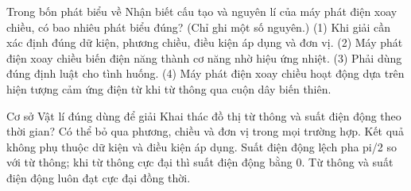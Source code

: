 \begin{ex}
Trong bốn phát biểu về Nhận biết cấu tạo và nguyên lí của máy phát điện xoay chiều, có bao nhiêu phát biểu đúng? (Chỉ ghi một số nguyên.) (1) Khi giải cần xác định đúng dữ kiện, phương chiều, điều kiện áp dụng và đơn vị. (2) Máy phát điện xoay chiều biến điện năng thành cơ năng nhờ hiệu ứng nhiệt. (3) Phải dùng đúng định luật cho tình huống. (4) Máy phát điện xoay chiều hoạt động dựa trên hiện tượng cảm ứng điện từ khi từ thông qua cuộn dây biến thiên.
\end{ex}

\begin{ex}
Cơ sở Vật lí đúng dùng để giải Khai thác đồ thị từ thông và suất điện động theo thời gian?
\choice
{Có thể bỏ qua phương, chiều và đơn vị trong mọi trường hợp.}
{Kết quả không phụ thuộc dữ kiện và điều kiện áp dụng.}
{\True Suất điện động lệch pha pi/2 so với từ thông; khi từ thông cực đại thì suất điện động bằng 0.}
{Từ thông và suất điện động luôn đạt cực đại đồng thời.}
\end{ex}

